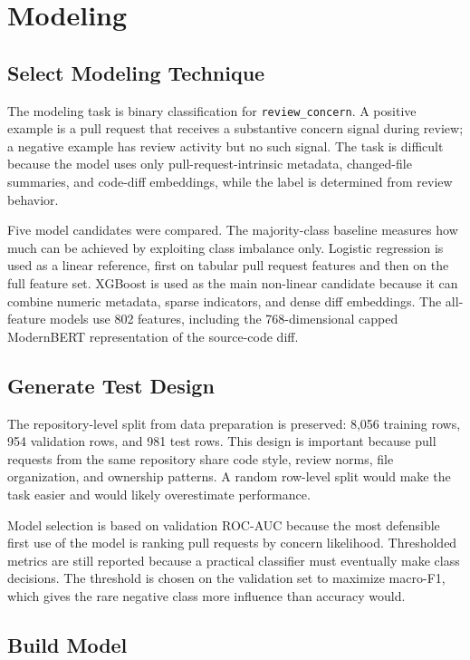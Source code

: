 \section{Modeling}

\subsection{Select Modeling Technique}

The modeling task is binary classification for \texttt{review\_concern}. A positive example is a pull request that receives a substantive concern signal during review; a negative example has review activity but no such signal. The task is difficult because the model uses only pull-request-intrinsic metadata, changed-file summaries, and code-diff embeddings, while the label is determined from review behavior.

Five model candidates were compared. The majority-class baseline measures how much can be achieved by exploiting class imbalance only. Logistic regression is used as a linear reference, first on tabular pull request features and then on the full feature set. XGBoost is used as the main non-linear candidate because it can combine numeric metadata, sparse indicators, and dense diff embeddings. The all-feature models use 802 features, including the 768-dimensional capped ModernBERT representation of the source-code diff.

\subsection{Generate Test Design}

The repository-level split from data preparation is preserved: 8,056 training rows, 954 validation rows, and 981 test rows. This design is important because pull requests from the same repository share code style, review norms, file organization, and ownership patterns. A random row-level split would make the task easier and would likely overestimate performance.

Model selection is based on validation ROC-AUC because the most defensible first use of the model is ranking pull requests by concern likelihood. Thresholded metrics are still reported because a practical classifier must eventually make class decisions. The threshold is chosen on the validation set to maximize macro-F1, which gives the rare negative class more influence than accuracy would.

\subsection{Build Model}

